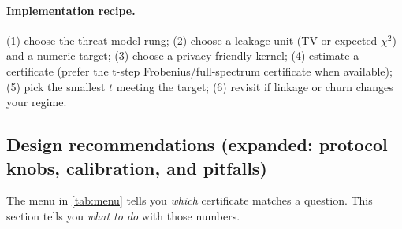 \documentclass[11pt]{article}
\begin{document}
\paragraph{Implementation recipe.}
(1) choose the threat-model rung; (2) choose a leakage unit (TV or expected
$\chi^2$) and a numeric target; (3) choose a privacy-friendly kernel; (4) estimate
a certificate (prefer the t-step Frobenius/full-spectrum certificate when available); (5) pick the smallest $t$ meeting the
target; (6) revisit if linkage or churn changes your regime.



\subsection*{Design recommendations (expanded: protocol knobs, calibration, and pitfalls)}
The menu in \cref{tab:menu} tells you \emph{which} certificate matches a question. This section tells you
\emph{what to do} with those numbers.
\end{document}
